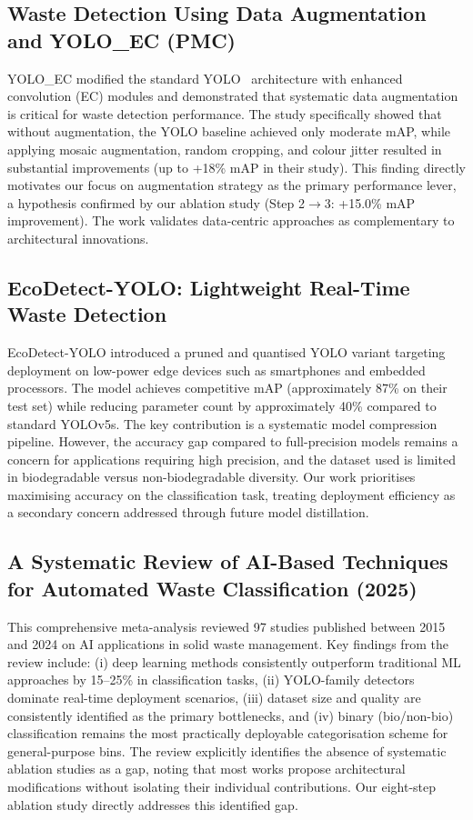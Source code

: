\subsection{Waste Detection Using Data Augmentation and YOLO\_EC (PMC)}

YOLO\_EC \cite{yolo_ec} modified the standard YOLO~\cite{redmon2016yolo} architecture with enhanced convolution (EC) modules and demonstrated that systematic data augmentation is critical for waste detection performance. The study specifically showed that without augmentation, the YOLO baseline achieved only moderate mAP, while applying mosaic augmentation, random cropping, and colour jitter resulted in substantial improvements (up to +18\% mAP in their study). This finding directly motivates our focus on augmentation strategy as the primary performance lever, a hypothesis confirmed by our ablation study (Step 2$\to$3: +15.0\% mAP improvement). The work validates data-centric approaches as complementary to architectural innovations.

\subsection{EcoDetect-YOLO: Lightweight Real-Time Waste Detection}

EcoDetect-YOLO \cite{ecodetect} introduced a pruned and quantised YOLO variant targeting deployment on low-power edge devices such as smartphones and embedded processors. The model achieves competitive mAP (approximately 87\% on their test set) while reducing parameter count by approximately 40\% compared to standard YOLOv5s. The key contribution is a systematic model compression pipeline. However, the accuracy gap compared to full-precision models remains a concern for applications requiring high precision, and the dataset used is limited in biodegradable versus non-biodegradable diversity. Our work prioritises maximising accuracy on the classification task, treating deployment efficiency as a secondary concern addressed through future model distillation.

\subsection{A Systematic Review of AI-Based Techniques for Automated Waste Classification (2025)}

This comprehensive meta-analysis \cite{systematic_review2025} reviewed 97 studies published between 2015 and 2024 on AI applications in solid waste management. Key findings from the review include: (i) deep learning methods consistently outperform traditional ML approaches by 15--25\% in classification tasks, (ii) YOLO-family detectors dominate real-time deployment scenarios, (iii) dataset size and quality are consistently identified as the primary bottlenecks, and (iv) binary (bio/non-bio) classification remains the most practically deployable categorisation scheme for general-purpose bins. The review explicitly identifies the absence of systematic ablation studies as a gap, noting that most works propose architectural modifications without isolating their individual contributions. Our eight-step ablation study directly addresses this identified gap.

